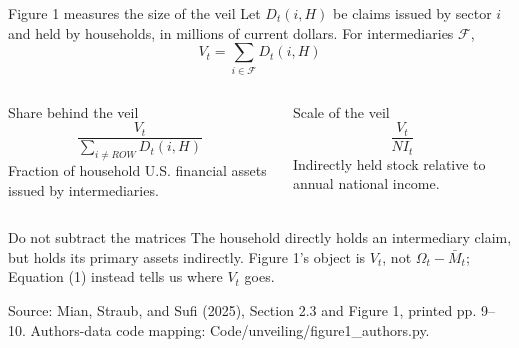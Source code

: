 \documentclass[aspectratio=169,11pt]{beamer}
\newcommand{\source}[1]{%
  \vfill
  {\color{MSSGray}\fontsize{6.5}{7.5}\selectfont #1\par}
}
\begin{document}
\begin{frame}{Figure 1 measures the size of the veil}
  \fontsize{9.4}{11.1}\selectfont
  Let \(D_t(i,H)\) be claims issued by sector \(i\) and held by households,
  in millions of current dollars. For intermediaries \(\mathcal F\),
  \[
    \boxed{V_t=\sum_{i\in\mathcal F}D_t(i,H)}
  \]
  \begin{columns}[T,onlytextwidth]
    \begin{block}{Share behind the veil}
      \[
        \frac{V_t}{\sum_{i\ne ROW}D_t(i,H)}
      \]
      Fraction of household U.S. financial assets issued by intermediaries.
    \end{block}

    \begin{block}{Scale of the veil}
      \[
        \frac{V_t}{NI_t}
      \]
      Indirectly held stock relative to annual national income.
    \end{block}
  \end{columns}
  \vspace{-0.04cm}
  \begin{alertblock}{Do not subtract the matrices}
    The household directly holds an intermediary claim, but holds its primary
    assets indirectly. Figure 1's object is \(V_t\), not
    \(\Omega_t-\bar M_t\); Equation (1) instead tells us where \(V_t\) goes.
  \end{alertblock}
  \source{Source: Mian, Straub, and Sufi (2025), Section 2.3 and Figure 1, printed pp. 9--10. Authors-data code mapping: Code/unveiling/figure1\_authors.py.}
\end{frame}
\end{document}
